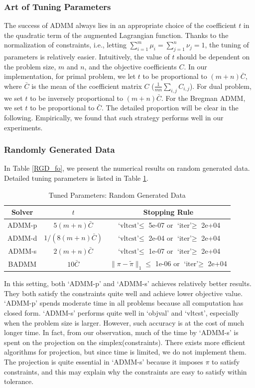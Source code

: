 \subsubsection{Art of Tuning Parameters}
The success of ADMM always lies in an appropriate choice of the coefficient $t$ in the quadratic term of the augmented Lagrangian function. Thanks to the normalization of constraints, i.e., letting $\sum_{i=1}^m\mu_i = \sum_{j=1}^n\nu_j = 1$, the tuning of parameters is relatively easier. Intuitively, the value of $t$ should be dependent on the problem size, $m$ and $n$, and the objective coefficients $C$. In our implementation, for primal problem, we let $t$ to be proportional to $(m+n)\bar C$, where $\bar C$ is the mean of the coefficient matrix $C$ ($\frac{1}{mn}\sum_{i, j}C_{i, j}$). For dual problem, we set $t$ to be inversely proportional to $(m+n)\bar C$. For the Bregman ADMM, we set $t$ to be proportional to $\bar C$. The detailed proportion will be clear in the following. Empirically, we found that such strategy performs well in our experiments.

\subsubsection{Randomly Generated Data}

In Table \ref{RGD_fo}, we present the numerical results on random generated data. 
Detailed tuning parameters is listed in Table \ref{param_rgd_fo}.
\begin{table}[h]
\centering
\caption{Tuned Parameters: Random Generated Data}
\label{param_rgd_fo}
\begin{tabular}{|c|c|c|}
\hline 
Solver & $t$ & Stopping Rule \\
\hline
ADMM-p & $5(m+n)\bar C$ & $\text{`vltcst'}\leqslant$ 5e-07 or $\text{`iter'}\geqslant$ 2e+04 \\\hline
ADMM-d & $1/(8(m+n)\bar C)$ & $\text{`vltcst'}\leqslant$ 2e-04 or $\text{`iter'}\geqslant$ 2e+04 \\\hline
ADMM-s & $2(m+n)\bar C$ & $\text{`vltcst'}\leqslant$ 1e-07 or $\text{`iter'}\geqslant$ 2e+04 \\\hline
BADMM & $10\bar C$ & $\|\pi-\tilde\pi\|_1\leqslant$ 1e-06 or $\text{`iter'}\geqslant$ 2e+04 \\
\hline
\end{tabular}
\end{table}

In this setting, both `ADMM-p' and `ADMM-s' achieves relatively better results. They both satisfy the constraints quite well and achieve lower objective value. `ADMM-p' spends moderate time in all problems because all computation has closed form. `ADMM-s' performs quite well in `objval' and `vltcst', especially when the problem size is larger. However, such accuracy is at the cost of much longer time. In fact, from our observation, much of the time by `ADMM-s' is spent on the projection on the simplex(constraints). There exists more efficient algorithms for projection, but since time is limited, we do not implement them. The projection is quite essential in `ADMM-s' because it imposes $\pi$ to satisfy constraints, and this may explain why the constraints are easy to satisfy within tolerance.

